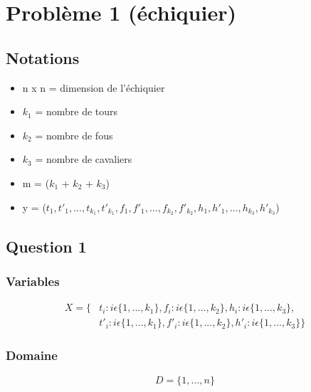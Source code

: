 \documentclass[a4paper,11pt]{article}
\begin{document}
\section{Problème 1 (échiquier)}
\subsection{Notations}
\begin{itemize}
\item n x n = dimension de l'échiquier
\item $k_{1}$ = nombre de tours
\item $k_{2}$ = nombre de fous
\item $k_{3}$ = nombre de cavaliers

\item m = ($k_{1}$ + $k_{2}$ + $k_{3}$)
\item y = ($t_{1}, t'_{1}, ..., t_{k_{1}}, t'_{k_{1}}, f_{1}, f'_{1}, ..., f_{k_{2}}, f'_{k_{2}}, h_{1}, h'_{1}, ..., h_{k_{3}}, h'_{k_{3}}$)
\end{itemize}

\subsection{Question 1}
\subsubsection{Variables}
\begin{equation}
  \begin{split}
    X = \{ &t_{i} : i \epsilon  \{1, ..., k_{1} \}, f_{i} : i \epsilon  \{1, ..., k_{2} \}, h_{i} : i \epsilon  \{1, ..., k_{3} \}, \\
    &t'_{i} : i \epsilon  \{1, ..., k_{1} \}, f'_{i} : i \epsilon  \{1, ..., k_{2} \}, h'_{i} : i \epsilon  \{1, ..., k_{3} \} \}
  \end{split}
\end{equation}

\subsubsection{Domaine}
$$D = \{1, ..., n \}$$
\end{document}
